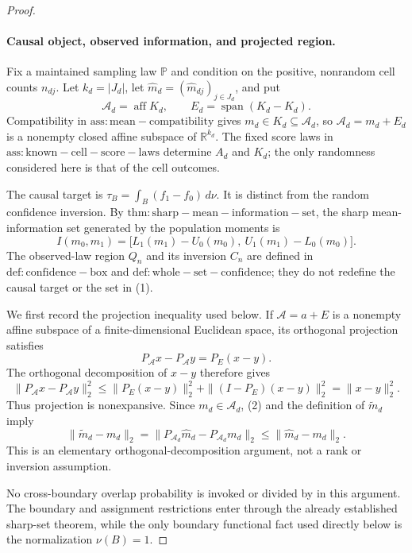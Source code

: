 \documentclass{article}
\begin{document}
\begin{proof}
\paragraph{Causal object, observed information, and projected region.}
Fix a maintained sampling law \(\mathbb P\) and condition on the positive, nonrandom cell counts \(n_{dj}\).  Let \(k_d=|J_d|\), let \(\widehat m_d=(\widehat m_{dj})_{j\in J_d}\), and put
\[
 \mathcal A_d=\operatorname{aff}K_d,
 \qquad
 E_d=\operatorname{span}(K_d-K_d).
\]
Compatibility in \(\mathrm{ass:mean-compatibility}\) gives \(m_d\in K_d\subseteq\mathcal A_d\), so \(\mathcal A_d=m_d+E_d\) is a nonempty closed affine subspace of \(\mathbb R^{k_d}\).  The fixed score laws in \(\mathrm{ass:known-cell-score-laws}\) determine \(A_d\) and \(K_d\); the only randomness considered here is that of the cell outcomes.

The causal target is \(\tau_B=\int_B(f_1-f_0)\,d\nu\).  It is distinct from the random confidence inversion.  By \(\mathrm{thm:sharp-mean-information-set}\), the sharp mean-information set generated by the population moments is
\[
 I(m_0,m_1)
 =\bigl[L_1(m_1)-U_0(m_0),\ U_1(m_1)-L_0(m_0)\bigr].       \tag{1}
\]
The observed-law region \(Q_n\) and its inversion \(C_n\) are defined in \(\mathrm{def:confidence-box}\) and \(\mathrm{def:whole-set-confidence}\); they do not redefine the causal target or the set in (1).

We first record the projection inequality used below.  If \(\mathcal A=a+E\) is a nonempty affine subspace of a finite-dimensional Euclidean space, its orthogonal projection satisfies
\[
 P_{\mathcal A}x-P_{\mathcal A}y=P_E(x-y).
\]
The orthogonal decomposition of \(x-y\) therefore gives
\[
 \|P_{\mathcal A}x-P_{\mathcal A}y\|_2^2
 \leq
 \|P_E(x-y)\|_2^2+\|(I-P_E)(x-y)\|_2^2
 =\|x-y\|_2^2.                                             \tag{2}
\]
Thus projection is nonexpansive.  Since \(m_d\in\mathcal A_d\), (2) and the definition of \(\widetilde m_d\) imply
\[
 \|\widetilde m_d-m_d\|_2
 =\|P_{\mathcal A_d}\widehat m_d-P_{\mathcal A_d}m_d\|_2
 \leq\|\widehat m_d-m_d\|_2.                              \tag{3}
\]
This is an elementary orthogonal-decomposition argument, not a rank or inversion assumption.

No cross-boundary overlap probability is invoked or divided by in this argument.  The boundary and assignment restrictions enter through the already established sharp-set theorem, while the only boundary functional fact used directly below is the normalization \(\nu(B)=1\).


\end{proof}
\end{document}

